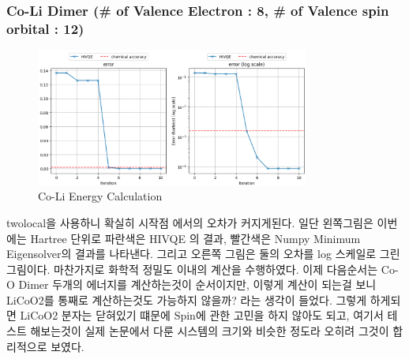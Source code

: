 \documentclass[11pt]{article}
\begin{document}
\subsubsection{Co-Li Dimer (\# of Valence Electron : 8, \# of Valence spin orbital : 12)}
\begin{figure}[H]
  \centering
  \includegraphics[width=0.8\textwidth]{fig/Co-Li.png}
  \caption{Co-Li Energy Calculation}
  \label{fig:first}
\end{figure}
twolocal을 사용하니 확실히 시작점 에서의 오차가 커지게된다. 
일단 왼쪽그림은 이번에는 Hartree 단위로 파란색은 HIVQE 의 결과, 빨간색은 Numpy Minimum Eigensolver의 결과를 나타낸다.
그리고 오른쪽 그림은 둘의 오차를 log 스케일로 그린 그림이다. 마찬가지로 화학적 정밀도 이내의 계산을 수행하였다. 
이제 다음순서는 Co-O Dimer 두개의 에너지를 계산하는것이 순서이지만, 이렇게 계산이 되는걸 보니 LiCoO2를 통째로 계산하는것도 가능하지 않을까? 라는 생각이 들었다. 
그렇게 하게되면 LiCoO2 분자는 닫혀있기 떄문에 Spin에 관한 고민을 하지 않아도 되고, 여기서 테스트 해보는것이 실제 논문에서 다룬 시스템의 크기와 비슷한 정도라 오히려 그것이 합리적으로 보였다. 
\end{document}
